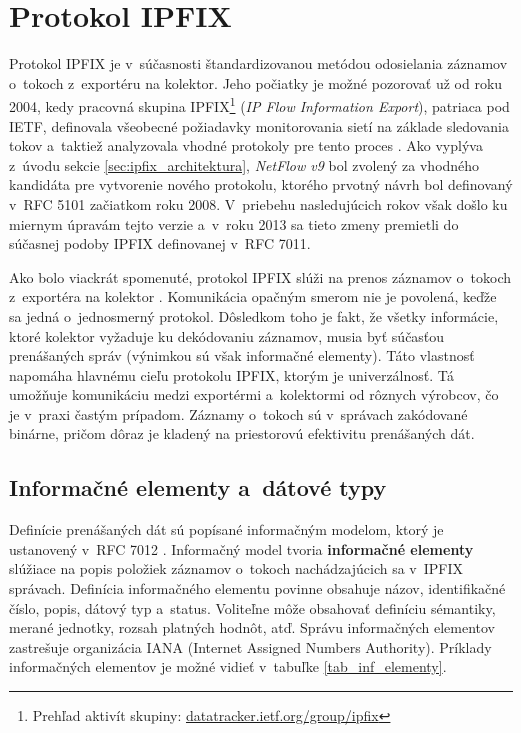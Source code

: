 \section{Protokol IPFIX}
\label{sec:ipfix}

Protokol IPFIX je v~súčasnosti štandardizovanou metódou odosielania záznamov o~tokoch z~exportéru na kolektor. Jeho počiatky je možné pozorovať už od roku 2004, kedy pracovná skupina IPFIX\footnote{Prehľad aktivít skupiny:
\href{https://datatracker.ietf.org/group/ipfix/documents}{datatracker.ietf.org/group/ipfix}} (\textit{IP Flow Information Export}), patriaca pod IETF, definovala všeobecné požiadavky monitorovania sietí na základe sledovania tokov a~taktiež analyzovala vhodné protokoly
pre tento proces \cite{rfc5101}. Ako vyplýva z~úvodu sekcie \ref{sec:ipfix_architektura}, \textit{NetFlow v9} bol zvolený za vhodného kandidáta pre vytvorenie nového protokolu, ktorého prvotný návrh bol definovaný v~RFC 5101 začiatkom roku 2008. V~priebehu
nasledujúcich rokov však došlo ku miernym úpravám tejto verzie a~v~roku 2013 sa tieto zmeny premietli do súčasnej podoby IPFIX definovanej v~RFC 7011.

Ako bolo viackrát spomenuté, protokol IPFIX slúži na prenos záznamov o~tokoch z~exportéra na kolektor \cite{rfc7011}. Komunikácia opačným smerom nie je povolená, keďže sa jedná o~jednosmerný protokol. Dôsledkom toho je fakt, že všetky informácie, ktoré kolektor vyžaduje ku dekódovaniu
záznamov, musia byť súčasťou prenášaných správ (výnimkou sú však informačné elementy). Táto vlastnosť napomáha hlavnému cieľu protokolu IPFIX, ktorým je univerzálnosť. Tá umožňuje komunikáciu medzi exportérmi a~kolektormi od rôznych výrobcov, čo je v~praxi častým prípadom.
Záznamy o~tokoch sú v~správach zakódované binárne, pričom dôraz je kladený na priestorovú efektivitu prenášaných dát.

\subsection*{Informačné elementy a~dátové typy}

Definície prenášaných dát sú popísané informačným modelom, ktorý je ustanovený v~RFC 7012 \cite{rfc7012}. Informačný model tvoria \textbf{informačné elementy} slúžiace na popis položiek záznamov o~tokoch nachádzajúcich sa v~IPFIX správach. Definícia informačného
elementu povinne obsahuje názov, identifikačné číslo, popis, dátový typ a~status. Voliteľne môže obsahovať definíciu sémantiky, merané jednotky, rozsah platných hodnôt, atď. Správu informačných elementov zastrešuje organizácia IANA (Internet Assigned Numbers Authority).
Príklady informačných elementov je možné vidieť v~tabuľke \ref{tab_inf_elementy}.

